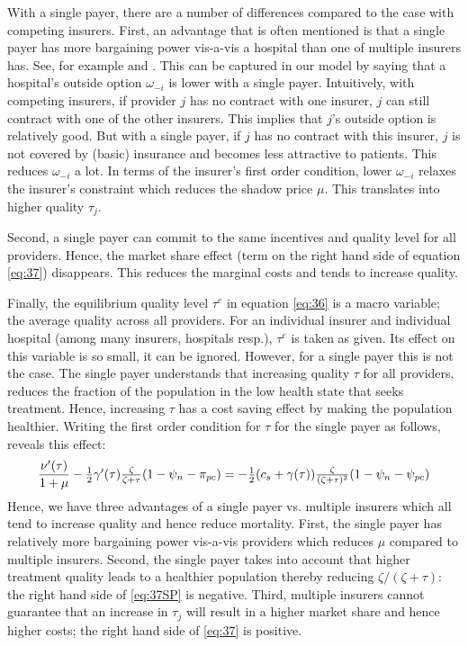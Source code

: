 \documentclass[12pt,english,a4paper]{article}
\begin{document}
With a single payer, there are a number of differences compared to the case with competing insurers. First, an advantage that is often mentioned is that a single payer has more bargaining power vis-a-vis a hospital than one of multiple insurers has. See, for example \cite{OberlanderSinglePayer} and \cite{BICHAY2020113454}. This can be captured in our model by saying that a hospital's outside option \(\omega_{-i}\) is lower with a single payer. Intuitively, with competing insurers, if provider \(j\) has no contract with one insurer, \(j\) can still contract with one of the other insurers. This implies that \(j\)'s outside option is relatively good. But with a single payer, if \(j\) has no contract with this insurer, \(j\) is not covered by (basic) insurance and becomes less attractive to patients. This reduces \(\omega_{-i}\) a lot. In terms of the insurer's first order condition, lower \(\omega_{-i}\) relaxes the insurer's constraint which reduces the shadow price \(\mu\). This translates into higher quality \(\tau_j\).

Second, a single payer can commit to the same incentives and quality level for all providers. Hence, the market share effect (term on the right hand side of equation \eqref{eq:37}) disappears. This reduces the marginal costs and tends to increase quality.

Finally, the equilibrium quality level \(\tau^e\) in equation \eqref{eq:36} is a macro variable; the average quality across all providers. For an individual insurer and individual hospital (among many insurers, hospitals resp.), \(\tau^e\) is taken as given. Its effect on this variable is so small, it can be ignored. However, for a single payer this is not the case. The single payer understands that increasing quality \(\tau\) for all providers, reduces the fraction of the population in the low health state that seeks treatment. Hence, increasing \(\tau\) has a cost saving effect by making the population healthier. Writing the first order condition for \(\tau\) for the single payer as follows, reveals this effect:
\begin{equation}
\label{eq:37SP}
 \frac{\nu'(\tau)}{1+\mu} - \textstyle{1\over 2} \gamma'(\tau) \frac{\zeta}{\zeta+\tau}(1-\psi_n-\pi_{pc}) = - \textstyle{1\over 2}(c_s+\gamma( \tau)) \frac{\zeta}{(\zeta+\tau)^2} (1-\psi_n -\psi_{pc})  
\end{equation}
Hence, we have three advantages of a single payer vs. multiple insurers which all tend to increase quality and hence reduce mortality. First, the single payer has relatively more bargaining power vis-a-vis providers which reduces \(\mu\) compared to multiple insurers. Second, the single payer takes into account that higher treatment quality leads to a healthier population thereby reducing \(\zeta/(\zeta+\tau)\): the right hand side of \eqref{eq:37SP} is negative. Third, multiple insurers cannot guarantee that an increase in \(\tau_j\) will result in a higher market share and hence higher costs; the right hand side of \eqref{eq:37} is positive.
\end{document}
